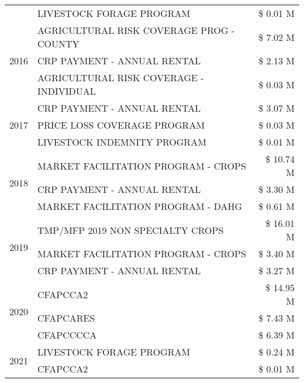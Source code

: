 \begin{tabular}{llr}
 & LIVESTOCK FORAGE PROGRAM & \$ 0.01 M \\
\cline{1-3}
\multirow[t]{3}{*}{2016} & AGRICULTURAL RISK COVERAGE PROG - COUNTY & \$ 7.02 M \\
 & CRP PAYMENT - ANNUAL RENTAL & \$ 2.13 M \\
 & AGRICULTURAL RISK COVERAGE - INDIVIDUAL & \$ 0.03 M \\
\cline{1-3}
\multirow[t]{3}{*}{2017} & CRP PAYMENT - ANNUAL RENTAL & \$ 3.07 M \\
 & PRICE LOSS COVERAGE PROGRAM & \$ 0.03 M \\
 & LIVESTOCK INDEMNITY PROGRAM & \$ 0.01 M \\
\cline{1-3}
\multirow[t]{3}{*}{2018} & MARKET FACILITATION PROGRAM - CROPS & \$ 10.74 M \\
 & CRP PAYMENT - ANNUAL RENTAL & \$ 3.30 M \\
 & MARKET FACILITATION PROGRAM - DAHG & \$ 0.61 M \\
\cline{1-3}
\multirow[t]{3}{*}{2019} & TMP/MFP 2019 NON SPECIALTY CROPS & \$ 16.01 M \\
 & MARKET FACILITATION PROGRAM - CROPS & \$ 3.40 M \\
 & CRP PAYMENT - ANNUAL RENTAL & \$ 3.27 M \\
\cline{1-3}
\multirow[t]{3}{*}{2020} & CFAPCCA2 & \$ 14.95 M \\
 & CFAPCARES & \$ 7.43 M \\
 & CFAPCCCCA & \$ 6.39 M \\
\cline{1-3}
\multirow[t]{2}{*}{2021} & LIVESTOCK FORAGE PROGRAM & \$ 0.24 M \\
 & CFAPCCA2 & \$ 0.01 M \\
\cline{1-3}
\bottomrule
\end{tabular}
